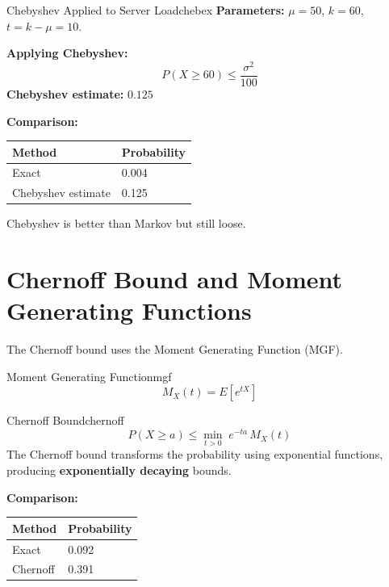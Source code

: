 \documentclass[12pt, a4paper]{article}
\newcommand{\EX}[1]{E\!\left[#1\right]}
\begin{document}
\begin{exmp}{Chebyshev Applied to Server Load}{chebex}
  \textbf{Parameters:} $\mu = 50$, $k = 60$, $t = k - \mu = 10$.

  \textbf{Applying Chebyshev:}
  \[
    P(X \geq 60) \leq \frac{\sigma^2}{100}
  \]
  \textbf{Chebyshev estimate:} $0.125$
\end{exmp}

\medskip
\textbf{Comparison:}
\begin{center}
\begin{tabular}{ll}
  \toprule
  \textbf{Method}    & \textbf{Probability} \\
  \midrule
  Exact              & 0.004  \\
  Chebyshev estimate & 0.125  \\
  \bottomrule
\end{tabular}
\end{center}

Chebyshev is better than Markov but still loose.

\section{Chernoff Bound and Moment Generating Functions}

The Chernoff bound uses the Moment Generating Function (MGF).

\begin{defn}{Moment Generating Function}{mgf}
  \[
    M_X(t) = \EX{e^{tX}}
  \]
\end{defn}

\begin{thm}{Chernoff Bound}{chernoff}
  \[
    P(X \geq a) \leq \min_{t > 0}\; e^{-ta}\,M_X(t)
  \]
  The Chernoff bound transforms the probability using exponential functions,
  producing \textbf{exponentially decaying} bounds.
\end{thm}

\medskip
\textbf{Comparison:}
\begin{center}
\begin{tabular}{ll}
  \toprule
  \textbf{Method} & \textbf{Probability} \\
  \midrule
  Exact           & 0.092 \\
  Chernoff        & 0.391 \\
  \bottomrule
\end{tabular}
\end{center}
\end{document}
